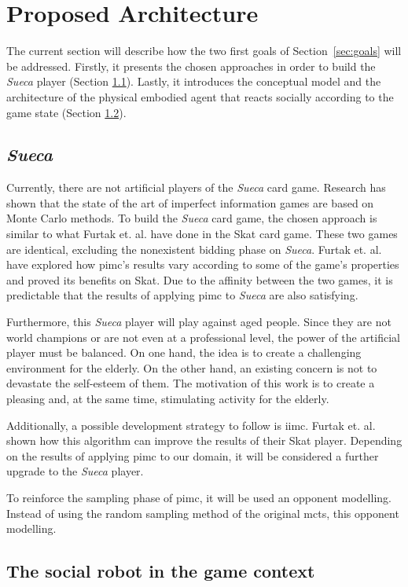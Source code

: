 \section{Proposed Architecture} \label{architecture}

The current section will describe how the two first goals of
Section~\ref{sec:goals} will be addressed.
Firstly, it presents the chosen approaches in order to build the \emph{Sueca} player (Section \ref{sec:sueca_solution}).
Lastly, it introduces the conceptual model and the architecture of the physical embodied agent that reacts socially according to the game state (Section \ref{sec:social_solution}).


\subsection{\emph{Sueca}}
\label{sec:sueca_solution}

Currently, there are not artificial players of the \emph{Sueca} card game.
Research has shown that the state of the art of imperfect information games are based on Monte Carlo methods.
To build the \emph{Sueca} card game, the chosen approach is similar to what Furtak et. al. have done in the Skat card game.
These two games are identical, excluding the nonexistent bidding phase on \emph{Sueca}.
Furtak et. al. have explored how \gls{pimc}'s results vary according to some of the game's properties and proved its benefits on Skat.
Due to the affinity between the two games, it is predictable that the results of applying \gls{pimc} to \emph{Sueca} are also satisfying.

Furthermore, this \emph{Sueca} player will play against aged people.
Since they are not world champions or are not even at a professional level, the power of the artificial player must be balanced.
On one hand, the idea is to create a challenging environment for the elderly.
On the other hand, an existing concern is not to devastate the self-esteem of them.
The motivation of this work is to create a pleasing and, at the same time, stimulating activity for the elderly.

Additionally, a possible development strategy to follow is \gls{iimc}.
Furtak et. al. shown how this algorithm can improve the results of their Skat player.
Depending on the results of applying \gls{pimc} to our domain, it will be considered a further upgrade to the \emph{Sueca} player.

To reinforce the sampling phase of \gls{pimc}, it will be used an opponent modelling.
Instead of using the random sampling method of the original \gls{mcts}, this opponent modelling.


\subsection{The social robot in the game context}
\label{sec:social_solution}

